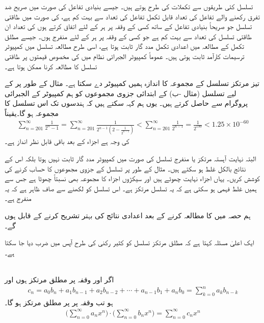 تسلسل کئی طریقوں سے تکملات کی طرح ہوتے ہیں۔ جیسے بنیادی تفاعل کی صورت میں صریح ضد تفرق رکھنے والے تفاعل کی تعداد قابل تکمل تفاعل کی تعداد سے بہت کم ہے،  کی صورت میں طاقتی تسلسل جو  صریحاً بنیادی تفاعل کے ساتھ کسی   کے  وقفہ  پر ہر  کے لئے  اتفاق کرتے ہوں کی تعداد ان طاقتی تسلسل کی تعداد سے بہت کم ہے جو کسی    کے وقفہ    پر ہر  کے لئے  منفرج ہوں۔ جیسے  مطلق تکمل کے مطالعہ میں اعدادی تکمل مدد گار ثابت ہوتا ہے، اسی طرح مطالعہ تسلسل میں کمپیوٹر ترسیمات کارآمد ثابت ہوتی ہیں۔ عموماً کمپیوٹر الجبرائی نظام میں  کی مخصوص قیمتوں پر طاقتی تسلسل کا مطالعہ کرنا ممکن ہوتا ہے۔

تیز مرتکز تسلسل کے مجموعہ  کا اندازہ ہمیں کمپیوٹر دے سکتا ہے۔ مثال کے طور پر     کے  لیے  تسلسل (مثال -ب) کے ابتدائی جزوی مجموعوں  کو  ہم کمپیوٹر کے  الجبرائی پروگرام   سے  حاصل کرتے ہیں۔ یوں ہم کہہ سکتے ہیں کہ  ہندسوں تک اس تسلسل کا مجموعہ  ہو گا۔یقیناً
\begin{align*}
\sum_{n=201}^{\infty}\frac{1}{2^n-1}=\sum_{n=201}^{\infty}\frac{1}{2^{n-1}(2-\tfrac{1}{2^{n-1}})}<\sum_{n=201}^{\infty}\frac{1}{2^{n-1}}=\frac{1}{2^{199}}<1.25\times 10^{-60}
\end{align*}
کی وجہ ہے  اجزاء کے بعد باقی قابل نظر انداز ہے۔

البتہ نہایت آہستہ مرتکز  یا منفرج تسلسل کی صورت میں کمپیوٹر مدد گار ثابت نہیں ہوتا  بلکہ اس کے نتائج بالکل غلط ہو سکتے ہیں۔ مثال کے طور پر تسلسل  کے جزوی مجموعوں  کا حساب کرنے کی کوشش کریں۔ یہاں اجزاء نہایت چھوٹے ہیں اور سیکڑوں اجزاء کا مجموعہ بھی نسبتاً   چھوٹا ہے جس سے ہمیں غلط فہمی ہو سکتی ہے کہ یہ تسلسل مرتکز ہے۔ اس تسلسل کو  لکھنے سے   صاف ظاہر ہے کہ یہ منفرج ہے۔

ہم حصہ  میں  کا مطالعہ کرنے کے بعد اعدادی نتائج کی بہتر تشریح کرنے کے قابل ہوں گے۔



ایک اعلیٰ مسئلہ کہتا ہے کہ مطلق مرتکز تسلسل کو کثیر رکنی کی طرح آپس میں ضرب دیا جا سکتا ہے۔

\\
اگر  اور  وقفہ  پر مطلق مرتکز ہوں اور
\begin{align*}
c_n=a_0b_n+a_1b_{n-1}+a_2b_{n-2}+\cdots+a_{n-1}b_1+a_nb_0=\sum_{k=0}^{n}a_kb_{n-k}
\end{align*}
ہو تب  وقفہ پر    پر  مطلق مرتکز ہو گا۔
\begin{align*}
\big(\sum_{n=0}^{\infty}a_nx^n\big)\cdot\big(\sum_{n=0}^{\infty}b_nx^n\big)=\sum_{n=0}^{\infty}c_nx^n
\end{align*}

